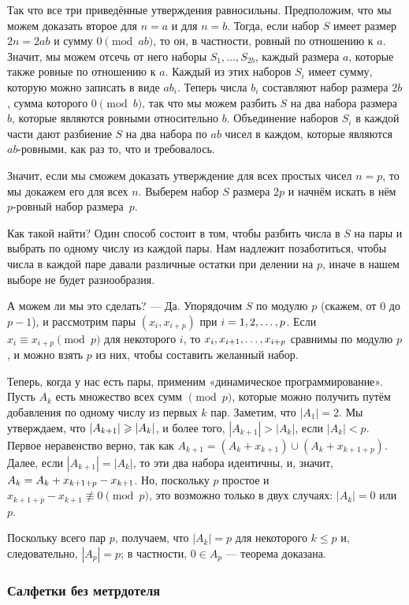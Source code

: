 Так что все три приведённые утверждения равносильны.
Предположим, что мы можем доказать второе для $n = a$ и для $n = b$.
Тогда, если набор $S$ имеет размер $2n = 2ab$ и сумму $0 \pmod {ab}$, то он, в частности, ровный по отношению к $a$. 
Значит, мы можем отсечь от него наборы $S_1,\dots,S_{2b}$, каждый размера $a$, которые также ровные по отношению к $a$.
Каждый из этих наборов $S_i$ имеет сумму, которую можно записать в виде $ab_i$.
Теперь числа $b_i$ составляют набор размера $2b$, сумма которого $0 \pmod b$, так что мы можем разбить $S$ на два набора размера $b$, которые являются ровными относительно $b$.
Объединение наборов $S_i$ в каждой части дают разбиение $S$ на два набора по $ab$ чисел в каждом, которые являются $ab$-ровными, как раз то, что и требовалось.

Значит, если мы сможем доказать утверждение для всех простых чисел $n=p$, то мы докажем его для всех $n$.
Выберем набор $S$ размера $2p$ и начнём искать в нём $p$-ровный набор размера~$p$.

Как такой найти?
Один способ состоит в том, чтобы разбить числа в $S$ на пары и выбрать по одному числу из каждой пары.
Нам  надлежит позаботиться, чтобы числа в каждой паре давали различные остатки при делении на $p$, иначе в нашем выборе не будет разнообразия.

А можем ли мы это сделать? --- Да.
Упорядочим $S$ по модулю $p$ (скажем, от $0$ до $p-1$), и рассмотрим пары $(x_i,x_{i+p})$ при $i\z=1,2,\dots, p$.
Если $x_i\equiv x_{i+p}\pmod p$ для некоторого $i$, то $x_i,x_{i+1},\z\dots,x_{i+p}$ сравнимы по модулю $p$, и можно взять $p$ из них, чтобы составить желанный набор.

Теперь, когда у нас есть пары, применим «динамическое программирование».
Пусть $A_k$ есть множество всех сумм $\pmod p$, которые можно получить путём добавления по одному числу из первых $k$ пар.
Заметим, что $|A_1|= 2$.
Мы утверждаем, что $|A_{k+1}|\z\ge|A_k|$, и более того, $|A_{k+1}|>|A_k|$, если $|A_k|< p$.
Первое неравенство верно, так как $A_{k+1} = (A_k+x_{k+1}) \cup (A_k+x_{k+1+p})$.
Далее, если $|A_{k+1}|=|A_k|$, то эти два набора идентичны, и, значит,  $A_k \z= A_k+x_{k+1+p}-x_{k+1}$.
Но, поскольку $p$ простое и $x_{k+1+p}-x_{k+1}\not\equiv 0\pmod p$, это возможно только в двух случаях: $|A_k|= 0$ или $p$.

Поскольку всего пар $p$, получаем, что $|A_k|= p$ для некоторого $k \le p$ и, следовательно, $|A_p|= p$; в частности, $0\in A_p$ --- теорема доказана. \heart

\subsubsection*{Салфетки без метрдотеля}

